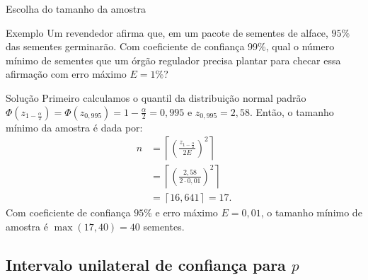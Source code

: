 \documentclass[8pt]{beamer}
\begin{document}
\begin{frame}{Escolha do tamanho da amostra}
	
\normalsize
	
	\begin{block}{Exemplo}
		Um revendedor afirma que, em um pacote de sementes de alface, $95\%$ das sementes germinarão. Com coeficiente de confiança 99\%, qual o número mínimo de sementes que um órgão regulador precisa plantar para checar essa afirmação com erro máximo $E=1\%$?
		
	\end{block}

	\begin{block}{Solução}
		Primeiro calculamos o quantil da distribuição normal padrão $\Phi\left( z_{1-\frac{\alpha}{2}} \right) = \Phi\left( z_{0,995} \right) = 1 - \frac{\alpha}{2} = 0,995$ 	e $z_{0,995} = 2,58$. Então, o tamanho mínimo da amostra é dada por:
		\begin{align*}
			n &= \left\lceil \left( \frac{z_{1-\frac{\alpha}{2}}}{2 E} \right)^2 \right\rceil\\
			&= \left\lceil \left( \frac{2,58}{2 \cdot 0,01} \right)^2 \right\rceil\\
			&= \left\lceil 16,641 \right\rceil = 17.
		\end{align*}	
		Com coeficiente de confiança $95\%$ e erro máximo $E=0,01$, o tamanho mínimo de amostra é $\max(17, 40) = 40$ sementes.
	\end{block}

\normalsize

\end{frame}

\subsection{Intervalo unilateral de confiança para $p$}
\end{document}
